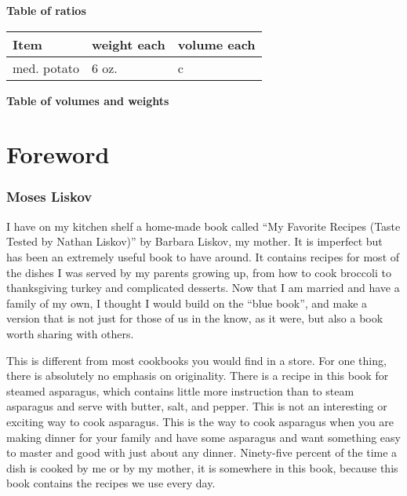 \documentclass[8pt]{report}
\newcommand{\fr}[2]{\nicefrac{#1}{#2}}
\begin{document}
\begin{center}
\begin{tabular}{|l|cccccc|}
\end{tabular}

\textbf{Table of ratios}

\vspace{1cm}

\begin{tabular}{|l|ll|} \hline
Item & weight each & volume each \\ \hline
med. potato & 6 oz. & \fr34 c \\
\hline
\end{tabular}

\textbf{Table of volumes and weights}

\end{center}

\tableofcontents
{}

 \chapter*{Foreword}
\subsection*{Moses Liskov}


I have on my kitchen shelf a home-made book called ``My Favorite Recipes (Taste Tested by Nathan Liskov)'' by Barbara Liskov, my mother.  It is imperfect but has been an extremely useful book to have around.  It contains recipes for most of the dishes I was served by my parents growing up, from how to cook broccoli to thanksgiving turkey and complicated desserts.  Now that I am married and have a family of my own, I thought I would build on the ``blue book'', and make a version that is not just for those of us in the know, as it were, but also a book worth sharing with others.

This is different from most cookbooks you would find in a store.  For one thing, there is absolutely no emphasis on originality.  There is a recipe in this book for steamed asparagus, which contains little more instruction than to steam asparagus and serve with butter, salt, and pepper.  This is not an interesting or exciting way to cook asparagus.  This is the way to cook asparagus when you are making dinner for your family and have some asparagus and want something easy to master and good with just about any dinner.  Ninety-five percent of the time a dish is cooked by me or by my mother, it is somewhere in this book, because this book contains the recipes we use every day.
\end{document}
